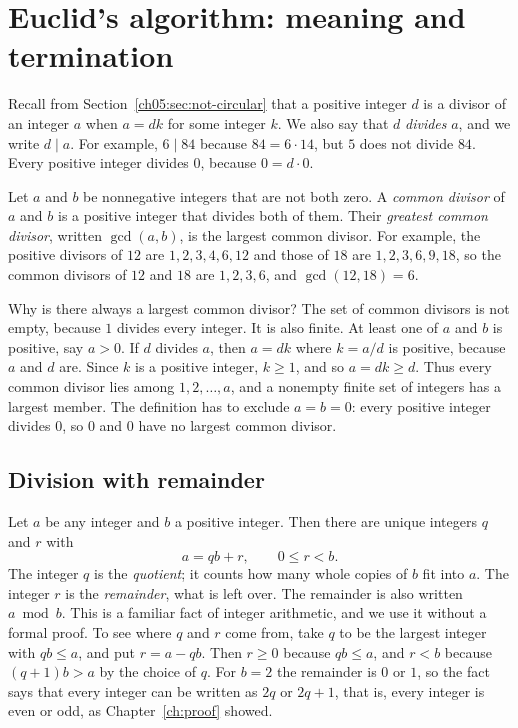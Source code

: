 \section{Euclid's algorithm: meaning and termination}\label{ch05:sec:euclid}
Recall from Section~\ref{ch05:sec:not-circular} that a positive integer $d$ is a divisor of an integer $a$ when $a=dk$ for some integer $k$. We also say that $d$ \emph{divides} $a$, and we write $d\mid a$. For example, $6\mid84$ because $84=6\cdot14$, but $5$ does not divide $84$. Every positive integer divides $0$, because $0=d\cdot0$.

Let $a$ and $b$ be nonnegative integers that are not both zero. A \emph{common divisor} of $a$ and $b$ is a positive integer that divides both of them. Their \emph{greatest common divisor}, written $\gcd(a,b)$, is the largest common divisor. For example, the positive divisors of $12$ are $1,2,3,4,6,12$ and those of $18$ are $1,2,3,6,9,18$, so the common divisors of $12$ and $18$ are $1,2,3,6$, and $\gcd(12,18)=6$.

Why is there always a largest common divisor? The set of common divisors is not empty, because $1$ divides every integer. It is also finite. At least one of $a$ and $b$ is positive, say $a>0$. If $d$ divides $a$, then $a=dk$ where $k=a/d$ is positive, because $a$ and $d$ are. Since $k$ is a positive integer, $k\ge1$, and so $a=dk\ge d$. Thus every common divisor lies among $1,2,\ldots,a$, and a nonempty finite set of integers has a largest member. The definition has to exclude $a=b=0$: every positive integer divides $0$, so $0$ and $0$ have no largest common divisor.

\subsection*{Division with remainder}
Let $a$ be any integer and $b$ a positive integer. Then there are unique integers $q$ and $r$ with
\[
a=qb+r,\qquad 0\le r<b.
\]
The integer $q$ is the \emph{quotient}; it counts how many whole copies of $b$ fit into $a$. The integer $r$ is the \emph{remainder}, what is left over. The remainder is also written $a\bmod b$. This is a familiar fact of integer arithmetic, and we use it without a formal proof. To see where $q$ and $r$ come from, take $q$ to be the largest integer with $qb\le a$, and put $r=a-qb$. Then $r\ge0$ because $qb\le a$, and $r<b$ because $(q+1)b>a$ by the choice of $q$. For $b=2$ the remainder is $0$ or $1$, so the fact says that every integer can be written as $2q$ or $2q+1$, that is, every integer is even or odd, as Chapter~\ref{ch:proof} showed.

